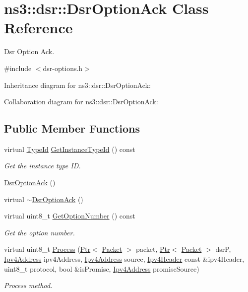 \hypertarget{classns3_1_1dsr_1_1DsrOptionAck}{}\section{ns3\+:\+:dsr\+:\+:Dsr\+Option\+Ack Class Reference}
\label{classns3_1_1dsr_1_1DsrOptionAck}


Dsr Option Ack.  




{\ttfamily \#include $<$dsr-\/options.\+h$>$}



Inheritance diagram for ns3\+:\+:dsr\+:\+:Dsr\+Option\+Ack\+:


Collaboration diagram for ns3\+:\+:dsr\+:\+:Dsr\+Option\+Ack\+:
\subsection*{Public Member Functions}
\begin{DoxyCompactItemize}
\item 
virtual \hyperlink{classns3_1_1TypeId}{Type\+Id} \hyperlink{classns3_1_1dsr_1_1DsrOptionAck_a0642d3cebaaf83b787418da94daf5a97}{Get\+Instance\+Type\+Id} () const 
\begin{DoxyCompactList}\small\item\em Get the instance type ID. \end{DoxyCompactList}\item 
\hyperlink{classns3_1_1dsr_1_1DsrOptionAck_abfe20ee60b19945bce61330d8253b318}{Dsr\+Option\+Ack} ()
\item 
virtual \hyperlink{classns3_1_1dsr_1_1DsrOptionAck_a1d489679275649350970d7437188a954}{$\sim$\+Dsr\+Option\+Ack} ()
\item 
virtual uint8\+\_\+t \hyperlink{classns3_1_1dsr_1_1DsrOptionAck_aae8fa029e2abd9f77204a4e486bf3bc1}{Get\+Option\+Number} () const 
\begin{DoxyCompactList}\small\item\em Get the option number. \end{DoxyCompactList}\item 
virtual uint8\+\_\+t \hyperlink{classns3_1_1dsr_1_1DsrOptionAck_a51694a3f0a2d13d588b008200b6abc13}{Process} (\hyperlink{classns3_1_1Ptr}{Ptr}$<$ \hyperlink{classns3_1_1Packet}{Packet} $>$ packet, \hyperlink{classns3_1_1Ptr}{Ptr}$<$ \hyperlink{classns3_1_1Packet}{Packet} $>$ dsrP, \hyperlink{classns3_1_1Ipv4Address}{Ipv4\+Address} ipv4\+Address, \hyperlink{classns3_1_1Ipv4Address}{Ipv4\+Address} source, \hyperlink{classns3_1_1Ipv4Header}{Ipv4\+Header} const \&ipv4\+Header, uint8\+\_\+t protocol, bool \&is\+Promisc, \hyperlink{classns3_1_1Ipv4Address}{Ipv4\+Address} promisc\+Source)
\begin{DoxyCompactList}\small\item\em Process method. \end{DoxyCompactList}\end{DoxyCompactItemize}

